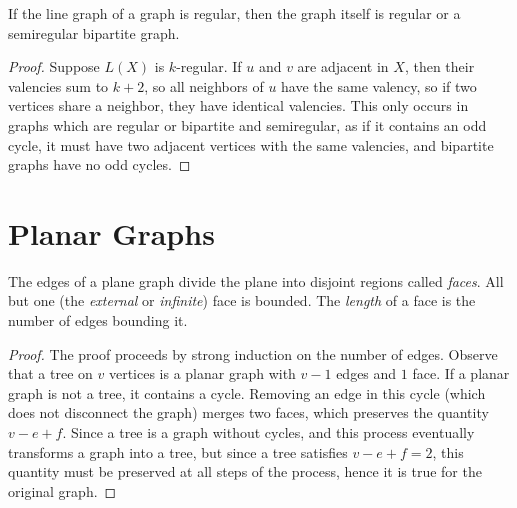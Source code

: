 \begin{lemma}
{If the line graph of a graph is regular, then the graph itself is regular or a semiregular bipartite graph.}
\end{lemma}
\begin{proof}
	Suppose $L(X)$ is $k$-regular.  If $u$ and $v$ are adjacent in $X$, then their valencies sum to $k+2$, so all neighbors of $u$ have the same valency, so if two vertices share a neighbor, they have identical valencies.  This only occurs in graphs which are regular or bipartite and semiregular, as if it contains an odd cycle, it must have two adjacent vertices with the same valencies, and bipartite graphs have no odd cycles.
\end{proof}


\section*{Planar Graphs}



The edges of a plane graph divide the plane into disjoint regions called \textit{faces}.  All but one (the \textit{external} or \textit{infinite}) face is bounded.  The \textit{length} of a face is the number of edges bounding it.


\begin{proof}
	
	The proof proceeds by strong induction on the number of edges. Observe that a tree on $v$ vertices is a planar graph with $v-1$ edges and $1$ face.  If a planar graph is not a tree, it contains a cycle.  Removing an edge in this cycle (which does not disconnect the graph) merges two faces, which preserves the quantity $v-e+f$.  Since a tree is a graph without cycles, and this process eventually transforms a graph into a tree, but since a tree satisfies $v-e+f=2$, this quantity must be preserved at all steps of the process, hence it is true for the original graph.
	
	
\end{proof}

